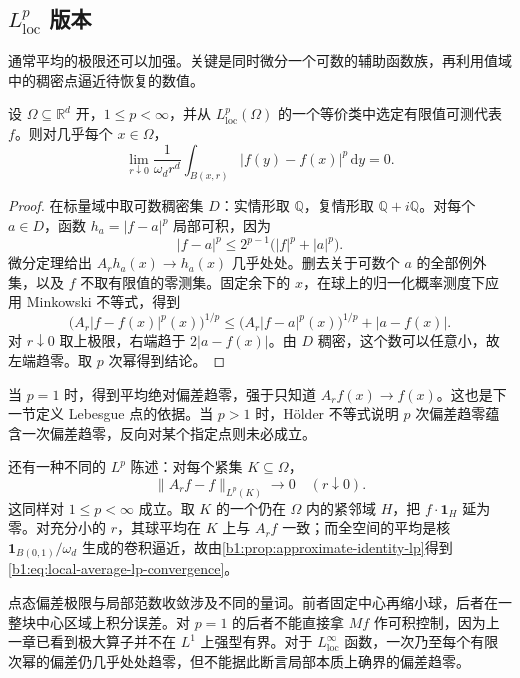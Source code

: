 \subsection{\texorpdfstring{\(L^p_{\mathrm{loc}}\)}{Lp} 版本}
\label{b1:subsec:140204}

通常平均的极限还可以加强。关键是同时微分一个可数的辅助函数族，再利用值域中的稠密点逼近待恢复的数值。

\begin{theorem}\label{b1:thm:lp-lebesgue-differentiation}
设 \(\Omega\subseteq\mathbb R^d\) 开，\(1\leq p<\infty\)，并从 \(L^p_{\mathrm{loc}}(\Omega)\) 的一个等价类中选定有限值可测代表 \(f\)。则对几乎每个 \(x\in\Omega\)，
\[
 \lim_{r\downarrow0}\frac1{\omega_dr^d}
          \int_{B(x,r)}|f(y)-f(x)|^p\,\mathrm dy=0.
\]
\end{theorem}
\begin{proof}
在标量域中取可数稠密集 \(D\)：实情形取 \(\mathbb Q\)，复情形取 \(\mathbb Q+i\mathbb Q\)。对每个 \(a\in D\)，函数 \(h_a=|f-a|^p\) 局部可积，因为
\[
 |f-a|^p\leq2^{p-1}\bigl(|f|^p+|a|^p\bigr).
\]
微分定理给出 \(A_rh_a(x)\to h_a(x)\) 几乎处处。删去关于可数个 \(a\) 的全部例外集，以及 \(f\) 不取有限值的零测集。固定余下的 \(x\)，在球上的归一化概率测度下应用 Minkowski 不等式，得到
\[
 \bigl(A_r|f-f(x)|^p(x)\bigr)^{1/p}
 \leq\bigl(A_r|f-a|^p(x)\bigr)^{1/p}+|a-f(x)|.
\]
对 \(r\downarrow0\) 取上极限，右端趋于 \(2|a-f(x)|\)。由 \(D\) 稠密，这个数可以任意小，故左端趋零。取 \(p\) 次幂得到结论。
\end{proof}

当 \(p=1\) 时，得到平均绝对偏差趋零，强于只知道 \(A_rf(x)\to f(x)\)。这也是下一节定义 Lebesgue 点的依据。当 \(p>1\) 时，Hölder 不等式说明 \(p\) 次偏差趋零蕴含一次偏差趋零，反向对某个指定点则未必成立。

\ProseParagraphBreak

还有一种不同的 \(L^p\) 陈述：对每个紧集 \(K\subseteq\Omega\)，
\begin{equation}\label{b1:eq:local-average-lp-convergence}
 \|A_rf-f\|_{L^p(K)}\longrightarrow0\quad(r\downarrow0).
\end{equation}
这同样对 \(1\leq p<\infty\) 成立。取 \(K\) 的一个仍在 \(\Omega\) 内的紧邻域 \(H\)，把 \(f\cdot\mathbf1_H\) 延为零。对充分小的 \(r\)，其球平均在 \(K\) 上与 \(A_rf\) 一致；而全空间的平均是核 \(\mathbf1_{B(0,1)}/\omega_d\) 生成的卷积逼近，故由\cref{b1:prop:approximate-identity-lp}得到\eqref{b1:eq:local-average-lp-convergence}。

\ProseParagraphBreak

点态偏差极限与局部范数收敛涉及不同的量词。前者固定中心再缩小球，后者在一整块中心区域上积分误差。对 \(p=1\) 的后者不能直接拿 \(Mf\) 作可积控制，因为上一章已看到极大算子并不在 \(L^1\) 上强型有界。对于 \(L^\infty_{\mathrm{loc}}\) 函数，一次乃至每个有限次幂的偏差仍几乎处处趋零，但不能据此断言局部本质上确界的偏差趋零。
